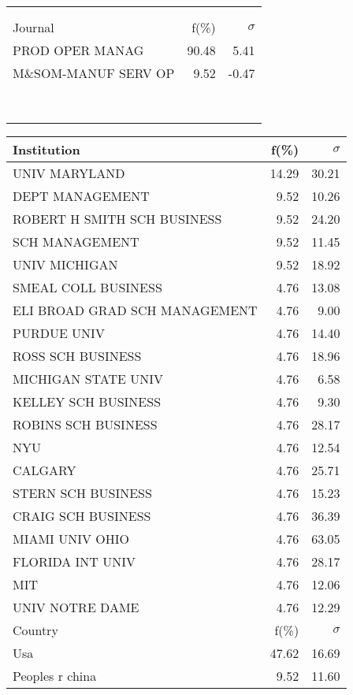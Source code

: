 \documentclass[a4paper,11pt]{report}
\begin{document}
\begin{landscape}
\begin{table}[!ht]
{\begin{tabular}{|l r  r|}
 &  & \\
 &  & \\
\hline
\hline
Journal & f(\%) & $\sigma$\\
\hline
PROD OPER MANAG & 90.48 & 5.41\\
M\&SOM-MANUF SERV OP & 9.52 & -0.47\\
 &  & \\
 &  & \\
 &  & \\
 &  & \\
 &  & \\
 &  & \\
 &  & \\
 &  & \\
\hline
\end{tabular}
}
{\scriptsize\begin{tabular}{|l r r|}
\hline
Institution & f(\%) & $\sigma$\\
\hline
UNIV MARYLAND & 14.29 & 30.21\\
DEPT MANAGEMENT & 9.52 & 10.26\\
ROBERT H SMITH SCH BUSINESS & 9.52 & 24.20\\
SCH MANAGEMENT & 9.52 & 11.45\\
UNIV MICHIGAN & 9.52 & 18.92\\
SMEAL COLL BUSINESS & 4.76 & 13.08\\
ELI BROAD GRAD SCH MANAGEMENT & 4.76 & 9.00\\
PURDUE UNIV & 4.76 & 14.40\\
ROSS SCH BUSINESS & 4.76 & 18.96\\
MICHIGAN STATE UNIV & 4.76 & 6.58\\
KELLEY SCH BUSINESS & 4.76 & 9.30\\
ROBINS SCH BUSINESS & 4.76 & 28.17\\
NYU & 4.76 & 12.54\\
CALGARY & 4.76 & 25.71\\
STERN SCH BUSINESS & 4.76 & 15.23\\
CRAIG SCH BUSINESS & 4.76 & 36.39\\
MIAMI UNIV OHIO & 4.76 & 63.05\\
FLORIDA INT UNIV & 4.76 & 28.17\\
MIT & 4.76 & 12.06\\
UNIV NOTRE DAME & 4.76 & 12.29\\
\hline
\hline
Country & f(\%) & $\sigma$\\
\hline
Usa & 47.62 & 16.69\\
Peoples r china & 9.52 & 11.60\\

\end{tabular}}
\end{table}
\end{landscape}
\end{document}
